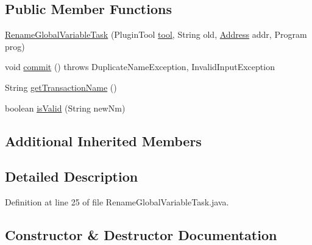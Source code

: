 \subsection*{Public Member Functions}
\begin{DoxyCompactItemize}
\item 
\mbox{\hyperlink{classghidra_1_1app_1_1plugin_1_1core_1_1decompile_1_1actions_1_1_rename_global_variable_task_a82d7a4229c8d93f192f446b6f10f5d20}{Rename\+Global\+Variable\+Task}} (Plugin\+Tool \mbox{\hyperlink{classghidra_1_1app_1_1plugin_1_1core_1_1decompile_1_1actions_1_1_rename_task_aded3c0474f9fa5697b5b550bc2709597}{tool}}, String old, \mbox{\hyperlink{class_address}{Address}} addr, Program prog)
\item 
void \mbox{\hyperlink{classghidra_1_1app_1_1plugin_1_1core_1_1decompile_1_1actions_1_1_rename_global_variable_task_aff31159c80123386fd113610f8eac9a2}{commit}} ()  throws Duplicate\+Name\+Exception, Invalid\+Input\+Exception 
\item 
String \mbox{\hyperlink{classghidra_1_1app_1_1plugin_1_1core_1_1decompile_1_1actions_1_1_rename_global_variable_task_a574b93c2c7cdbebbc29cb683d7611825}{get\+Transaction\+Name}} ()
\item 
boolean \mbox{\hyperlink{classghidra_1_1app_1_1plugin_1_1core_1_1decompile_1_1actions_1_1_rename_global_variable_task_ae44be3cebe425dba3a59c93a519afe51}{is\+Valid}} (String new\+Nm)
\end{DoxyCompactItemize}
\subsection*{Additional Inherited Members}


\subsection{Detailed Description}


Definition at line 25 of file Rename\+Global\+Variable\+Task.\+java.



\subsection{Constructor \& Destructor Documentation}
\mbox{\label{classghidra_1_1app_1_1plugin_1_1core_1_1decompile_1_1actions_1_1_rename_global_variable_task_a82d7a4229c8d93f192f446b6f10f5d20}} 
